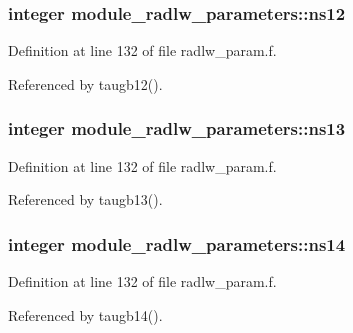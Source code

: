 \subsubsection[{\texorpdfstring{ns12}{ns12}}]{\setlength{\rightskip}{0pt plus 5cm}integer module\+\_\+radlw\+\_\+parameters\+::ns12}\hypertarget{namespacemodule__radlw__parameters_aabdc77471aadc2932eb213f3b7ecb66c}{}\label{namespacemodule__radlw__parameters_aabdc77471aadc2932eb213f3b7ecb66c}


Definition at line 132 of file radlw\+\_\+param.\+f.



Referenced by taugb12().

\subsubsection[{\texorpdfstring{ns13}{ns13}}]{\setlength{\rightskip}{0pt plus 5cm}integer module\+\_\+radlw\+\_\+parameters\+::ns13}\hypertarget{namespacemodule__radlw__parameters_a239c74495526cdf72b28e1f5c1d0318e}{}\label{namespacemodule__radlw__parameters_a239c74495526cdf72b28e1f5c1d0318e}


Definition at line 132 of file radlw\+\_\+param.\+f.



Referenced by taugb13().

\subsubsection[{\texorpdfstring{ns14}{ns14}}]{\setlength{\rightskip}{0pt plus 5cm}integer module\+\_\+radlw\+\_\+parameters\+::ns14}\hypertarget{namespacemodule__radlw__parameters_a1d49c23da2ed69069a97f861a28a531e}{}\label{namespacemodule__radlw__parameters_a1d49c23da2ed69069a97f861a28a531e}


Definition at line 132 of file radlw\+\_\+param.\+f.



Referenced by taugb14().

